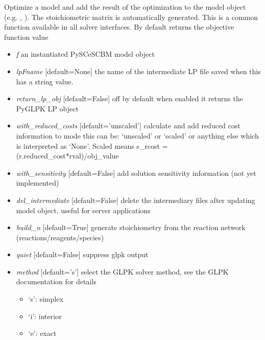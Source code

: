 \documentclass[a4paper,11pt,english]{sphinxmanual}
\begin{document}
\begin{fulllineitems}
\label{modules_doc:cbmpy.CBGLPK.glpk_analyzeModel}
Optimize a model and add the result of the optimization to the model object
(e.g. , ). The stoichiometric
matrix is automatically generated. This is a common function available in all
solver interfaces. By default returns the objective function value
\begin{itemize}
\item {} 
\emph{f} an instantiated PySCeSCBM model object

\item {} 
\emph{lpFname} {[}default=None{]} the name of the intermediate LP file saved when this has a string value.

\item {} 
\emph{return\_lp\_obj} {[}default=False{]} off by default when enabled it returns the PyGLPK LP object

\item {} 
\emph{with\_reduced\_costs} {[}default='unscaled'{]} calculate and add reduced cost information to mode this can be: `unscaled' or `scaled'
or anything else which is interpreted as `None'. Scaled means s\_rcost = (r.reduced\_cost*rval)/obj\_value

\item {} 
\emph{with\_sensitivity} {[}default=False{]} add solution sensitivity information (not yet implemented)

\item {} 
\emph{del\_intermediate} {[}default=False{]} delete the intermediary files after updating model object, useful for server applications

\item {} 
\emph{build\_n} {[}default=True{]} generate stoichiometry from the reaction network (reactions/reagents/species)

\item {} 
\emph{quiet} {[}default=False{]} suppress glpk output

\item {} 
\emph{method} {[}default='s'{]} select the GLPK solver method, see the GLPK documentation for details
\begin{itemize}
\item {} 
`s': simplex

\item {} 
`i': interior

\item {} 
`e': exact

\end{itemize}

\end{itemize}

\end{fulllineitems}
\end{document}
